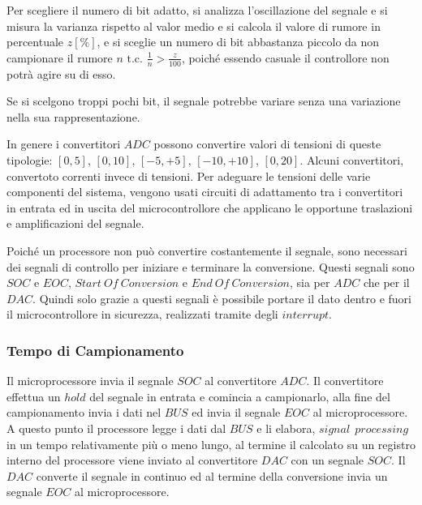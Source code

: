 \documentclass{article}
\numberwithin{equation}{subsection}
\begin{document}
Per scegliere il numero di bit adatto, si analizza l'oscillazione del segnale e si misura la varianza rispetto al valor medio e si calcola il valore di rumore in percentuale 
$z[\%]$, e si sceglie un numero di bit abbastanza piccolo da non campionare il rumore $n\mbox{ t.c. }\displaystyle\frac{1}{n}>\frac{z}{100}$, poiché essendo casuale il 
controllore non potrà agire su di esso. 

Se si scelgono troppi pochi bit, il segnale potrebbe variare senza una variazione nella sua rappresentazione. 

In genere i convertitori $ADC$ possono convertire valori di tensioni di queste tipologie: $[0,5]$, $[0,10]$, $[-5,+5]$, $[-10,+10]$, $[0,20]$. Alcuni convertitori, convertoto 
correnti invece di tensioni. Per adeguare le tensioni delle varie componenti del sistema, vengono usati circuiti di adattamento tra i convertitori in entrata ed in uscita del 
microcontrollore che applicano le opportune traslazioni e amplificazioni del segnale. 

Poiché un processore non può convertire costantemente il segnale, sono necessari dei segnali di controllo per iniziare e terminare la conversione. Questi segnali sono $SOC$ e 
$EOC$, $Start\:Of\:Conversion$ e $End\:Of\:Conversion$, sia per $ADC$ che per il $DAC$. Quindi solo grazie a questi segnali è possibile portare il dato dentro e fuori il 
microcontrollore in sicurezza, realizzati tramite degli $interrupt$.  

\subsubsection{Tempo di Campionamento}

Il microprocessore invia il segnale $SOC$ al convertitore $ADC$. Il convertitore effettua un $hold$ del segnale in entrata e comincia a campionarlo, alla fine del campionamento  
invia i dati nel $BUS$ ed invia il segnale $EOC$ al microprocessore. A questo punto il processore legge i dati dal $BUS$ e li elabora, $signal\:\:processing$ in un tempo 
relativamente più o meno lungo, al termine il calcolato su un registro interno del processore viene inviato al convertitore $DAC$ con un segnale $SOC$. Il $DAC$ converte il 
segnale in continuo ed al termine della conversione invia un segnale $EOC$ al microprocessore. 
\end{document}
